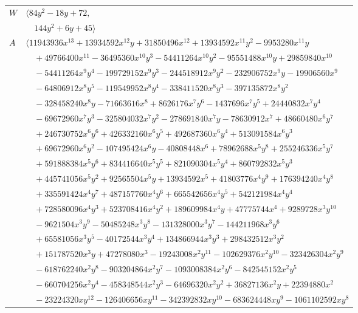 \documentclass[11pt]{article}
\begin{document}
\begin{longtable}{@{}ll@{}}
$W$ & $\langle 84y^{2}-18y+72,$\\
 & $\quad 144y^{2}+6y+45\rangle$\\
$A$ & $\langle 11943936x^{13}+13934592x^{12}y+31850496x^{12}+13934592x^{11}y^{2}-9953280x^{11}y$\\
 & $\quad +49766400x^{11}-36495360x^{10}y^{3}-54411264x^{10}y^{2}-95551488x^{10}y+29859840x^{10}$\\
 & $\quad -54411264x^{9}y^{4}-199729152x^{9}y^{3}-244518912x^{9}y^{2}-232906752x^{9}y-19906560x^{9}$\\
 & $\quad -64806912x^{8}y^{5}-119549952x^{8}y^{4}-338411520x^{8}y^{3}-397135872x^{8}y^{2}$\\
 & $\quad -328458240x^{8}y-71663616x^{8}+8626176x^{7}y^{6}-1437696x^{7}y^{5}+24440832x^{7}y^{4}$\\
 & $\quad -69672960x^{7}y^{3}-325804032x^{7}y^{2}-278691840x^{7}y-78630912x^{7}+48660480x^{6}y^{7}$\\
 & $\quad +246730752x^{6}y^{6}+426332160x^{6}y^{5}+492687360x^{6}y^{4}+513091584x^{6}y^{3}$\\
 & $\quad +69672960x^{6}y^{2}-107495424x^{6}y-40808448x^{6}+78962688x^{5}y^{8}+255246336x^{5}y^{7}$\\
 & $\quad +591888384x^{5}y^{6}+834416640x^{5}y^{5}+821090304x^{5}y^{4}+860792832x^{5}y^{3}$\\
 & $\quad +445741056x^{5}y^{2}+92565504x^{5}y+13934592x^{5}+41803776x^{4}y^{9}+176394240x^{4}y^{8}$\\
 & $\quad +335591424x^{4}y^{7}+487157760x^{4}y^{6}+665542656x^{4}y^{5}+542121984x^{4}y^{4}$\\
 & $\quad +728580096x^{4}y^{3}+523708416x^{4}y^{2}+189609984x^{4}y+47775744x^{4}+9289728x^{3}y^{10}$\\
 & $\quad -9621504x^{3}y^{9}-50485248x^{3}y^{8}-131328000x^{3}y^{7}-144211968x^{3}y^{6}$\\
 & $\quad +65581056x^{3}y^{5}-40172544x^{3}y^{4}+134866944x^{3}y^{3}+298432512x^{3}y^{2}$\\
 & $\quad +151787520x^{3}y+47278080x^{3}-19243008x^{2}y^{11}-102629376x^{2}y^{10}-323426304x^{2}y^{9}$\\
 & $\quad -618762240x^{2}y^{8}-903204864x^{2}y^{7}-1093008384x^{2}y^{6}-842545152x^{2}y^{5}$\\
 & $\quad -660704256x^{2}y^{4}-458348544x^{2}y^{3}-64696320x^{2}y^{2}+36827136x^{2}y+22394880x^{2}$\\
 & $\quad -23224320xy^{12}-126406656xy^{11}-342392832xy^{10}-683624448xy^{9}-1061102592xy^{8}$\\

\end{longtable}
\end{document}
